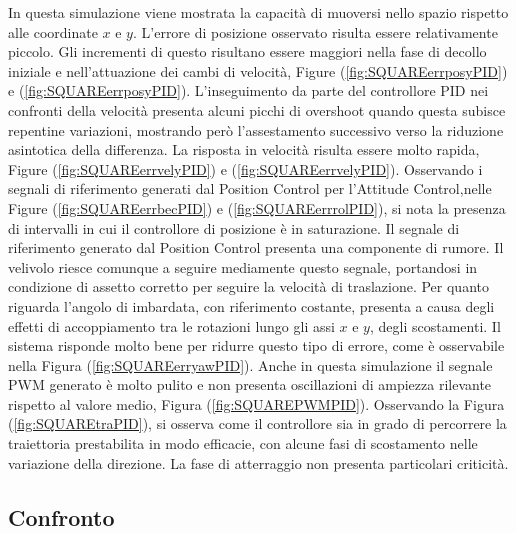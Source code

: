 In questa simulazione viene mostrata la capacità di muoversi nello spazio rispetto alle coordinate $x$ e $y$. L'errore di posizione osservato risulta essere relativamente piccolo. Gli incrementi di questo risultano essere maggiori nella fase di decollo iniziale e nell'attuazione dei cambi di velocità, Figure (\ref{fig:SQUAREerrposyPID}) e (\ref{fig:SQUAREerrposyPID}). L'inseguimento da parte del controllore PID nei confronti della velocità presenta alcuni picchi di overshoot quando questa subisce repentine variazioni, mostrando però l'assestamento successivo verso la riduzione asintotica della differenza. La risposta in velocità risulta essere molto rapida, Figure (\ref{fig:SQUAREerrvelyPID}) e (\ref{fig:SQUAREerrvelyPID}). Osservando i segnali di riferimento generati dal Position Control per l'Attitude Control,nelle Figure (\ref{fig:SQUAREerrbecPID}) e (\ref{fig:SQUAREerrrolPID}), si nota la presenza di intervalli in cui il controllore di posizione è in saturazione. Il segnale di riferimento generato dal Position Control presenta una componente di rumore. Il velivolo riesce comunque a seguire mediamente questo segnale, portandosi in condizione di assetto corretto per seguire la velocità di traslazione. Per quanto riguarda l'angolo di imbardata, con riferimento costante, presenta a causa degli effetti di accoppiamento tra le rotazioni lungo gli assi $x$ e $y$, degli scostamenti. Il sistema risponde molto bene per ridurre questo tipo di errore, come è osservabile nella Figura (\ref{fig:SQUAREerryawPID}). Anche in questa simulazione il segnale PWM generato è molto pulito e non presenta oscillazioni di ampiezza rilevante rispetto al valore medio, Figura (\ref{fig:SQUAREPWMPID}). Osservando la Figura (\ref{fig:SQUAREtraPID}), si osserva come il controllore sia in grado di percorrere la traiettoria prestabilita in modo efficacie, con alcune fasi di scostamento nelle variazione della direzione. La fase di atterraggio non presenta particolari criticità.

\subsection{Confronto}
